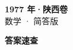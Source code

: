 \documentclass[zihao=-4, a4paper]{ctexart}
\begin{document}
\begin{center}
  {\Large\bfseries 1977 年·陕西卷}\\[4pt]
  {\large 数学 · 简答版}
\end{center}
\medskip
{}

\clearpage
{}
\begin{center}{\Large\bfseries 答案速查}\end{center}
\medskip

\end{document}
